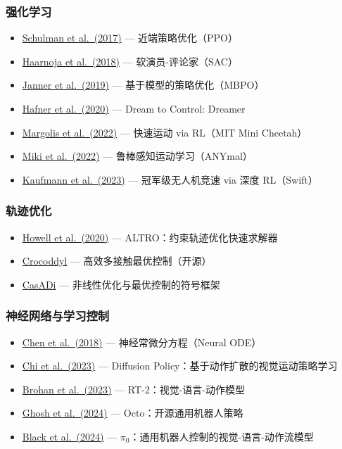 \subsubsection*{强化学习}
\begin{itemize}[nosep]
    \item \href{https://arxiv.org/abs/1707.06347}{Schulman et al.\ (2017)} --- 近端策略优化（PPO）
    \item \href{https://arxiv.org/abs/1801.01290}{Haarnoja et al.\ (2018)} --- 软演员-评论家（SAC）
    \item \href{https://arxiv.org/abs/1906.08253}{Janner et al.\ (2019)} --- 基于模型的策略优化（MBPO）
    \item \href{https://arxiv.org/abs/1912.01603}{Hafner et al.\ (2020)} --- Dream to Control: Dreamer
    \item \href{https://arxiv.org/abs/2208.07855}{Margolis et al.\ (2022)} --- 快速运动 via RL（MIT Mini Cheetah）
    \item \href{https://arxiv.org/abs/2109.11978}{Miki et al.\ (2022)} --- 鲁棒感知运动学习（ANYmal）
    \item \href{https://arxiv.org/abs/2310.08984}{Kaufmann et al.\ (2023)} --- 冠军级无人机竞速 via 深度 RL（Swift）
\end{itemize}

\subsubsection*{轨迹优化}
\begin{itemize}[nosep]
    \item \href{https://arxiv.org/abs/2007.01850}{Howell et al.\ (2020)} --- ALTRO：约束轨迹优化快速求解器
    \item \href{https://github.com/loco-3d/crocoddyl}{Crocoddyl} --- 高效多接触最优控制（开源）
    \item \href{https://web.casadi.org/}{CasADi} --- 非线性优化与最优控制的符号框架
\end{itemize}

\subsubsection*{神经网络与学习控制}
\begin{itemize}[nosep]
    \item \href{https://arxiv.org/abs/1806.07366}{Chen et al.\ (2018)} --- 神经常微分方程（Neural ODE）
    \item \href{https://arxiv.org/abs/2303.04137}{Chi et al.\ (2023)} --- Diffusion Policy：基于动作扩散的视觉运动策略学习
    \item \href{https://arxiv.org/abs/2307.15818}{Brohan et al.\ (2023)} --- RT-2：视觉-语言-动作模型
    \item \href{https://arxiv.org/abs/2405.12213}{Ghosh et al.\ (2024)} --- Octo：开源通用机器人策略
    \item \href{https://arxiv.org/abs/2410.24164}{Black et al.\ (2024)} --- $\pi_0$：通用机器人控制的视觉-语言-动作流模型
\end{itemize}

